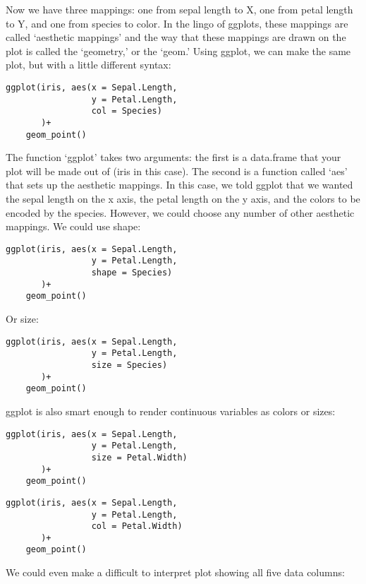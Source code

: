 \documentclass[11pt]{article}
\begin{document}
Now we have three mappings: one from sepal length to X, one from
  petal length to Y, and one from species to color. In the lingo of
  ggplots, these mappings are called `aesthetic mappings' and the way
  that these mappings are drawn on the plot is called the `geometry,'
  or the `geom.' Using ggplot, we can make the same plot, but with a
  little different syntax:

\begin{verbatim}
ggplot(iris, aes(x = Sepal.Length,
                 y = Petal.Length,
                 col = Species)
       )+
    geom_point()
\end{verbatim}


The function `ggplot' takes two arguments: the first is a data.frame
  that your plot will be made out of (iris in this case). The second is a function called
  `aes' that sets up the aesthetic mappings. In this case, we told
  ggplot that we wanted the sepal length on the x axis, the petal
  length on the y axis, and the colors to be encoded by the
  species. However, we could choose any number of other aesthetic
  mappings. We could use shape:

\begin{verbatim}
ggplot(iris, aes(x = Sepal.Length,
                 y = Petal.Length,
                 shape = Species)
       )+
    geom_point()
\end{verbatim}



Or size:

\begin{verbatim}
ggplot(iris, aes(x = Sepal.Length,
                 y = Petal.Length,
                 size = Species)
       )+
    geom_point()
\end{verbatim}


ggplot is also smart enough to render continuous variables as colors or sizes:

\begin{verbatim}
ggplot(iris, aes(x = Sepal.Length,
                 y = Petal.Length,
                 size = Petal.Width)
       )+
    geom_point()
\end{verbatim}


\begin{verbatim}
ggplot(iris, aes(x = Sepal.Length,
                 y = Petal.Length,
                 col = Petal.Width)
       )+
    geom_point()
\end{verbatim}


We could even make a difficult to interpret plot showing all five
  data columns:
\end{document}
